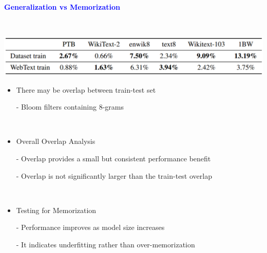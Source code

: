 \documentclass[professionalfont]{beamer}
\begin{document}
\begin{frame}

\begin{center}
    { \textbf{\textcolor{blue}{ {\fontsize{12}{14}\selectfont Generalization vs Memorization} }} }
\end{center}
\\[0.3cm]

\begin{center}
    \includegraphics[width=1.0\textwidth]{table6.png}
\end{center}

{\fontsize{10}{14}\selectfont 
\begin{itemize}
    \item There may be overlap between train-test set
    
    - Bloom filters containing 8-grams

    \\[0.3cm]

    \item Overall Overlap Analysis

    - Overlap provides a small but consistent performance benefit

    - Overlap is not significantly larger than the train-test overlap

    \\[0.3cm]

    \item Testing for Memorization

    - Performance improves as model size increases

    - It indicates underfitting rather than over-memorization
\end{itemize}
}

\end{frame}
\end{document}
